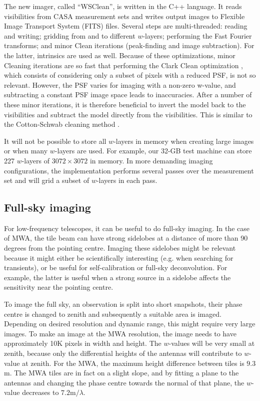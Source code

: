 \documentclass[useAMS,usenatbib]{mn2e}
\begin{document}
The new imager, called ``WSClean'', is written in the C++ language. It reads visibilities from CASA measurement sets and writes output images to Flexible Image Transport System (FITS) files. Several steps are multi-threaded: reading and writing; gridding from and to different $w$-layers; performing the Fast Fourier transforms; and minor Clean iterations (peak-finding and image subtraction). For the latter, intrinsics are used as well. Because of these optimizations, minor Cleaning iterations are so fast that performing the Clark Clean optimization \citep{clark-clean}, which consists of considering only a subset of pixels with a reduced PSF, is not so relevant. However, the PSF varies for imaging with a non-zero w-value, and subtracting a constant PSF image space leads to inaccuracies. After a number of these minor iterations, it is therefore beneficial to invert the model back to the visibilities and subtract the model directly from the visibilities. This is similar to the Cotton-Schwab cleaning method \citep{cotton-schwab-clean}.

It will not be possible to store all $w$-layers in memory when creating large images or when many $w$-layers are used. For example, our 32-GB test machine can store 227 $w$-layers of $3072\times3072$ in memory. In more demanding imaging configurations, the implementation performs several passes over the measurement set and will grid a subset of $w$-layers in each pass.

\subsection{Full-sky imaging}
For low-frequency telescopes, it can be useful to do full-sky imaging. In the case of MWA, the tile beam can have strong sidelobes at a distance of more than 90 degrees from the pointing centre. Imaging these sidelobes might be relevant because it might either be scientifically interesting (e.g. when searching for transients), or be useful for self-calibration or full-sky deconvolution. For example, the latter is useful when a strong source in a sidelobe affects the sensitivity near the pointing centre.

To image the full sky, an observation is split into short snapshots, their phase centre is changed to zenith and subsequently a suitable area is imaged. Depending on desired resolution and dynamic range, this might require very large images. To make an image at the MWA resolution, the image needs to have approximately 10K pixels in width and height. The $w$-values will be very small at zenith, because only the differential heights of the antennas will contribute to $w$-value at zenith. For the MWA, the maximum height difference between tiles is $9.3$m. The MWA tiles are in fact on a slight slope, and by fitting a plane to the antennas and changing the phase centre towards the normal of that plane, the $w$-value decreases to $7.2\textrm{m} / \lambda$.
\end{document}
